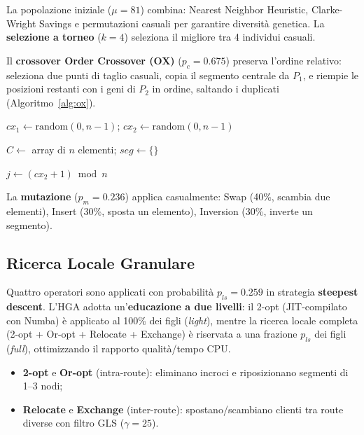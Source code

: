 La popolazione iniziale ($\mu = 81$) combina: Nearest Neighbor Heuristic,
Clarke-Wright Savings \cite{clarke1964scheduling} e permutazioni casuali per
garantire diversit\`a genetica. La \textbf{selezione a torneo} \cite{goldberg1991comparative}
($k=4$) seleziona il migliore tra 4 individui casuali.

Il \textbf{crossover Order Crossover (OX)} \cite{davis1985applying}
($p_c = 0.675$) preserva l'ordine relativo: seleziona due punti di taglio casuali,
copia il segmento centrale da $P_1$, e riempie le posizioni restanti con i geni
di $P_2$ in ordine, saltando i duplicati (Algoritmo~\ref{alg:ox}).

\begin{algorithm}[H]
\scriptsize
\caption{Order Crossover (OX) \cite{davis1985applying}}
\label{alg:ox}

$cx_1 \gets \text{random}(0, n-1)$; $cx_2 \gets \text{random}(0, n-1)$\;

$C \gets$ array di $n$ elementi; $seg \gets \{\}$\;

$j \gets (cx_2 + 1) \bmod n$\;
\;
\end{algorithm}

La \textbf{mutazione} ($p_m = 0.236$) applica casualmente: Swap (40\%, scambia
due elementi), Insert (30\%, sposta un elemento), Inversion (30\%, inverte un
segmento).

\subsection{Ricerca Locale Granulare}

Quattro operatori sono applicati con probabilit\`a $p_{ls} = 0.259$ in strategia
\textbf{steepest descent}.
L'HGA adotta un'\textbf{educazione a due livelli}: il 2-opt (JIT-compilato con
Numba) \`e applicato al 100\% dei figli (\textit{light}), mentre la ricerca
locale completa (2-opt + Or-opt + Relocate + Exchange) \`e riservata a una
frazione $p_{ls}$ dei figli (\textit{full}), ottimizzando il rapporto
qualit\`a/tempo CPU.
\begin{itemize}[nosep]
    \item \textbf{2-opt} e \textbf{Or-opt} (intra-route): eliminano incroci e
    riposizionano segmenti di 1--3 nodi;
    \item \textbf{Relocate} e \textbf{Exchange} (inter-route): spostano/scambiano
    clienti tra route diverse con filtro GLS \cite{toth2003granular} ($\gamma=25$).
\end{itemize}

